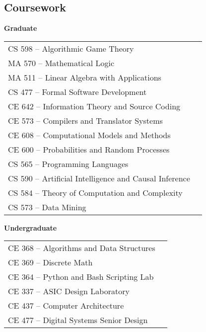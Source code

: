 \documentclass[12pt,a4paper,sans]{moderncv}        %
\begin{document}
\vspace{2pt}



\subsection{Coursework}
\begin{minipage}[t]{0.45\linewidth}
  \raggedright
  \textbf{Graduate}
  \begin{tabular}{ll}
    CS 598 -- Algorithmic Game Theory \\
    MA 570 -- Mathematical Logic \\
    MA 511 -- Linear Algebra with Applications \\
    CS 477 -- Formal Software Development \\
    CE 642 -- Information Theory and Source Coding \\
    CE 573 -- Compilers and Translator Systems \\
    CE 608 -- Computational Models and Methods \\
    CE 600 -- Probabilities and Random Processes \\
    CS 565 -- Programming Languages \\
    CS 590 -- Artificial Intelligence and Causal Inference \\
    CS 584 -- Theory of Computation and Complexity \\
    CS 573 -- Data Mining \\
  \end{tabular}
\end{minipage}
\hfill
\begin{minipage}[t]{0.45\linewidth}
  \raggedright
  \textbf{Undergraduate}
  \begin{tabular}{ll}
    CE 368 -- Algorithms and Data Structures \\
    CE 369 -- Discrete Math \\
    CE 364 -- Python and Bash Scripting Lab \\
    CE 337 -- ASIC Design Laboratory \\
    CE 437 -- Computer Architecture \\
    CE 477 -- Digital Systems Senior Design \\
  \end{tabular}
\end{minipage}
\end{document}
